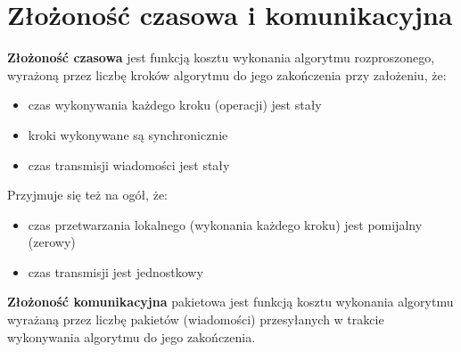 \documentclass[11pt]{article}
\begin{document}
\section{Złożoność czasowa i komunikacyjna}
\textbf{Złożoność czasowa} jest funkcją kosztu wykonania algorytmu rozproszonego, wyrażoną przez liczbę kroków algorytmu do jego zakończenia przy założeniu, że:
\begin{itemize}
\item czas wykonywania każdego kroku (operacji) jest stały
\item kroki wykonywane są synchronicznie
\item czas transmisji wiadomości jest stały
\end{itemize}
Przyjmuje się też na ogół, że:
\begin{itemize}
\item czas przetwarzania lokalnego (wykonania każdego kroku) jest pomijalny (zerowy)
\item czas transmisji jest jednostkowy
\end{itemize}
\medskip 
\textbf{Złożoność komunikacyjna} pakietowa jest funkcją kosztu wykonania algorytmu wyrażaną przez liczbę pakietów (wiadomości) przesyłanych w trakcie wykonywania algorytmu do jego zakończenia.

\bigskip 
\end{document}
